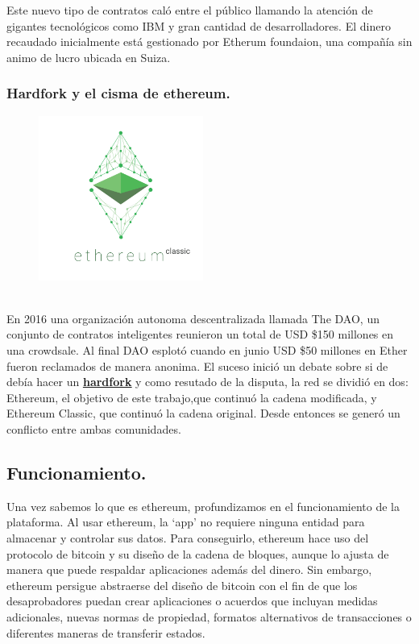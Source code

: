 \documentclass[11pt,a4paper]{article}
\begin{document}
Este nuevo tipo de contratos caló entre el público llamando la atención de gigantes tecnológicos como IBM y gran cantidad de desarrolladores. El dinero recaudado inicialmente está gestionado por Etherum foundaion\footnotemark, una compañía sin animo de lucro ubicada en Suiza.	\\


\subsubsection{Hardfork y el cisma de ethereum.}
\label{sec:dao}
\begin{figure}
  \caption{\ \ }
  \includegraphics[width=5.4cm]{images/classic1.png}
\end{figure} 
En 2016 una organización autonoma descentralizada llamada The DAO, un conjunto de contratos inteligentes reunieron un total de USD \$150 millones en una crowdsale. Al final DAO esplotó cuando en junio USD \$50 millones en Ether fueron reclamados de manera anonima. El suceso inició un debate sobre si de debía hacer un 
\hyperref[sec:hardfork]{\textbf{\underline{hardfork}}} y como resutado de la disputa, la red se dividió en dos: Ethereum, el objetivo de este trabajo,que continuó la cadena modificada, y Ethereum Classic, que continuó la cadena original. Desde entonces se generó un conflicto entre ambas comunidades.\\


\subsection{Funcionamiento.\\} 
Una vez sabemos lo que es ethereum, profundizamos en el funcionamiento de la plataforma.
Al usar ethereum, la ‘app’ no requiere ninguna entidad para almacenar y controlar sus datos. Para conseguirlo, ethereum hace uso del protocolo de bitcoin y su diseño de la cadena de bloques, aunque lo ajusta de manera que puede respaldar aplicaciones además del dinero. Sin embargo, ethereum persigue abstraerse del diseño de bitcoin con el fin de que los desaprobadores puedan crear aplicaciones o acuerdos que incluyan medidas adicionales, nuevas normas de propiedad, formatos alternativos de transacciones o diferentes maneras de transferir estados.\\
\end{document}
